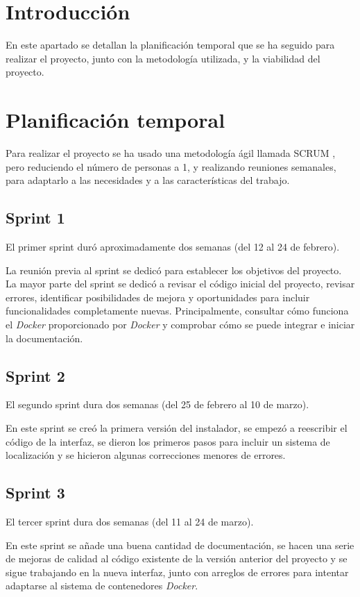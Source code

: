 
\section{Introducción}
En este apartado se detallan la planificación temporal que se ha seguido para realizar el proyecto, junto con la metodología utilizada, y la viabilidad del proyecto.

\section{Planificación temporal}
Para realizar el proyecto se ha usado una metodología ágil llamada SCRUM \cite{scrum}, pero reduciendo el número de personas a 1, y realizando reuniones semanales, para adaptarlo a las necesidades y a las características del trabajo.

\subsection{Sprint 1}
El primer sprint duró aproximadamente dos semanas (del 12 al 24 de febrero).

La reunión previa al sprint se dedicó para establecer los objetivos del proyecto.
La mayor parte del sprint se dedicó a revisar el código inicial del proyecto, revisar errores, identificar posibilidades de mejora y oportunidades para incluir funcionalidades completamente nuevas. Principalmente, consultar cómo funciona el \textit{Docker} proporcionado por \textit{Docker} y comprobar cómo se puede integrar e iniciar la documentación.

\subsection{Sprint 2}
El segundo sprint dura dos semanas (del 25 de febrero al 10 de marzo).

En este sprint se creó la primera versión del instalador, se empezó a reescribir el código de la interfaz, se dieron los primeros pasos para incluir un sistema de localización y se hicieron algunas correcciones menores de errores.
\subsection{Sprint 3}
El tercer sprint dura dos semanas (del 11 al 24 de marzo).

En este sprint se añade una buena cantidad de documentación, se hacen una serie de mejoras de calidad al código existente de la versión anterior del proyecto y se sigue trabajando en la nueva interfaz, junto con arreglos de errores para intentar adaptarse al sistema de contenedores \textit{Docker}.
